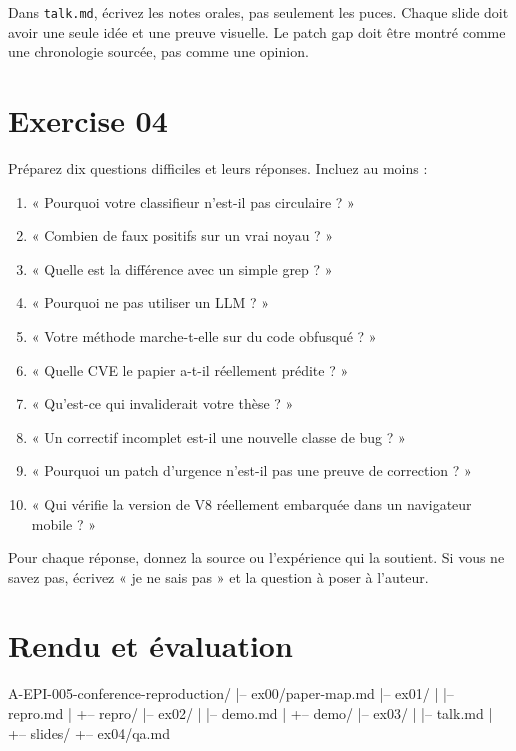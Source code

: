 \documentclass{training}
\begin{document}
Dans \texttt{talk.md}, écrivez les notes orales, pas seulement les puces.
Chaque slide doit avoir une seule idée et une preuve visuelle. Le patch gap
doit être montré comme une chronologie sourcée, pas comme une opinion.

\chapter{Exercise 04}
\makeheaderfiles

Préparez dix questions difficiles et leurs réponses. Incluez au moins :

\begin{enumerate}
  \item « Pourquoi votre classifieur n'est-il pas circulaire ? »
  \item « Combien de faux positifs sur un vrai noyau ? »
  \item « Quelle est la différence avec un simple grep ? »
  \item « Pourquoi ne pas utiliser un LLM ? »
  \item « Votre méthode marche-t-elle sur du code obfusqué ? »
  \item « Quelle CVE le papier a-t-il réellement prédite ? »
  \item « Qu'est-ce qui invaliderait votre thèse ? »
  \item « Un correctif incomplet est-il une nouvelle classe de bug ? »
  \item « Pourquoi un patch d'urgence n'est-il pas une preuve de
        correction ? »
  \item « Qui vérifie la version de V8 réellement embarquée dans un
        navigateur mobile ? »
\end{enumerate}

Pour chaque réponse, donnez la source ou l'expérience qui la soutient. Si
vous ne savez pas, écrivez « je ne sais pas » et la question à poser à
l'auteur.

\chapter{Rendu et évaluation}

\begin{console}
A-EPI-005-conference-reproduction/
|-- ex00/paper-map.md
|-- ex01/
|   |-- repro.md
|   +-- repro/
|-- ex02/
|   |-- demo.md
|   +-- demo/
|-- ex03/
|   |-- talk.md
|   +-- slides/
+-- ex04/qa.md
\end{console}
\end{document}
